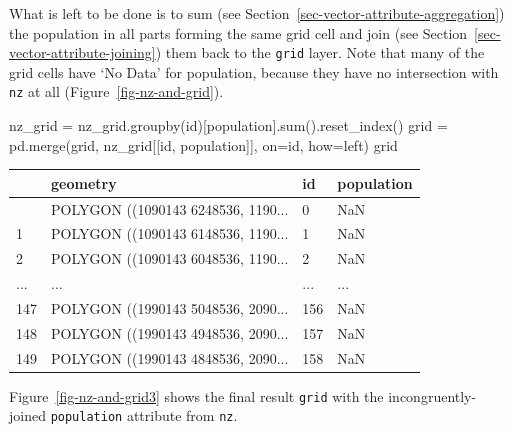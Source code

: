 \documentclass[
  letterpaper,
]{krantz}
\newenvironment{Shaded}{\begin{snugshade}}{\end{snugshade}}
\newcommand{\BuiltInTok}[1]{\textcolor[rgb]{0.00,0.23,0.31}{#1}}
\newcommand{\NormalTok}[1]{\textcolor[rgb]{0.00,0.23,0.31}{#1}}
\newcommand{\OperatorTok}[1]{\textcolor[rgb]{0.37,0.37,0.37}{#1}}
\newcommand{\StringTok}[1]{\textcolor[rgb]{0.13,0.47,0.30}{#1}}
\begin{document}
What is left to be done is to sum (see
Section~\ref{sec-vector-attribute-aggregation}) the population in all
parts forming the same grid cell and join (see
Section~\ref{sec-vector-attribute-joining}) them back to the
\texttt{grid} layer. Note that many of the grid cells have `No Data' for
population, because they have no intersection with \texttt{nz} at all
(Figure~\ref{fig-nz-and-grid}).

\begin{Shaded}
\begin{Highlighting}[]
\NormalTok{nz\_grid }\OperatorTok{=}\NormalTok{ nz\_grid.groupby(}\StringTok{\textquotesingle{}id\textquotesingle{}}\NormalTok{)[}\StringTok{\textquotesingle{}population\textquotesingle{}}\NormalTok{].}\BuiltInTok{sum}\NormalTok{().reset\_index()}
\NormalTok{grid }\OperatorTok{=}\NormalTok{ pd.merge(grid, nz\_grid[[}\StringTok{\textquotesingle{}id\textquotesingle{}}\NormalTok{, }\StringTok{\textquotesingle{}population\textquotesingle{}}\NormalTok{]], on}\OperatorTok{=}\StringTok{\textquotesingle{}id\textquotesingle{}}\NormalTok{, how}\OperatorTok{=}\StringTok{\textquotesingle{}left\textquotesingle{}}\NormalTok{)}
\NormalTok{grid}
\end{Highlighting}
\end{Shaded}

\begin{longtable}[]{@{}llll@{}}
\toprule\noalign{}
& geometry & id & population \\
\midrule\noalign{}
\endhead
\bottomrule\noalign{}
\endlastfoot
0 & POLYGON ((1090143 6248536, 1190... & 0 & NaN \\
1 & POLYGON ((1090143 6148536, 1190... & 1 & NaN \\
2 & POLYGON ((1090143 6048536, 1190... & 2 & NaN \\
... & ... & ... & ... \\
147 & POLYGON ((1990143 5048536, 2090... & 156 & NaN \\
148 & POLYGON ((1990143 4948536, 2090... & 157 & NaN \\
149 & POLYGON ((1990143 4848536, 2090... & 158 & NaN \\
\end{longtable}

Figure~\ref{fig-nz-and-grid3} shows the final result \texttt{grid} with
the incongruently-joined \texttt{population} attribute from \texttt{nz}.
\end{document}
